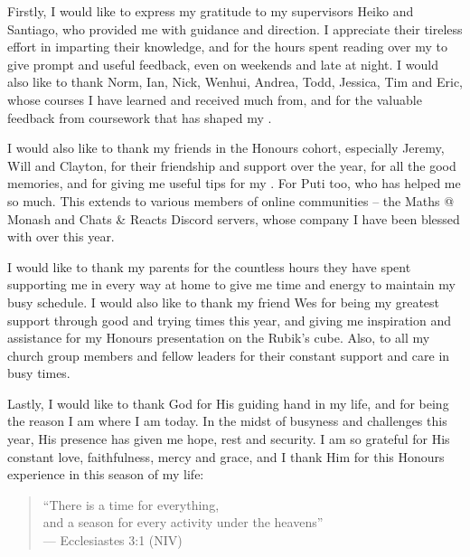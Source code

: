 Firstly, I would like to express my gratitude to my supervisors Heiko and Santiago, who provided me with guidance and direction. I appreciate their tireless effort in imparting their knowledge, and for the hours spent reading over my \thesis{} to give prompt and useful feedback, even on weekends and late at night. I would also like to thank Norm, Ian, Nick, Wenhui, Andrea, Todd, Jessica, Tim and Eric, whose courses I have learned and received much from, and for the valuable feedback from coursework that has shaped my \thesis{}.

I would also like to thank my friends in the Honours cohort, especially Jeremy, Will and Clayton, for their friendship and support over the year, for all the good memories, and for giving me useful tips for my \thesis{}. For Puti too, who has helped me so much. This extends to various members of online communities -- the Maths @ Monash and Chats \& Reacts Discord servers, whose company I have been blessed with over this year.

I would like to thank my parents for the countless hours they have spent supporting me in every way at home to give me time and energy to maintain my busy schedule. I would also like to thank my friend Wes for being my greatest support through good and trying times this year, and giving me inspiration and assistance for my Honours presentation on the Rubik's cube. Also, to all my church group members and fellow leaders for their constant support and care in busy times.

Lastly, I would like to thank God for His guiding hand in my life, and for being the reason I am where I am today. In the midst of busyness and challenges this year, His presence has given me hope, rest and security. I am so grateful for His constant love, faithfulness, mercy and grace, and I thank Him for this Honours experience in this season of my life:

\begin{quote}
    ``There is a time for everything, \\
    \hspace*{15pt} and a season for every activity under the heavens'' \\
    \null\hfill --- Ecclesiastes 3:1 (NIV)
\end{quote}